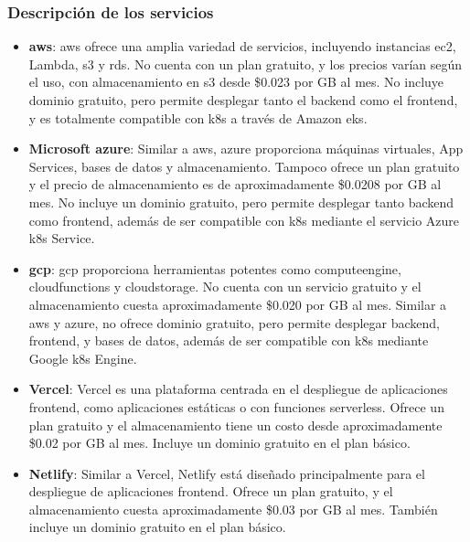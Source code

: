 \subsubsection*{Descripción de los servicios}


\begin{itemize}
    \item \textbf{\gls{aws}\cite{aws-ref}}: \gls{aws} ofrece una amplia variedad de servicios, incluyendo instancias \gls{ec2}, Lambda, \gls{s3} y \gls{rds}. No cuenta con un plan gratuito, y los precios varían según el uso, con almacenamiento en \gls{s3} desde \$0.023 por GB al mes. No incluye dominio gratuito, pero permite desplegar tanto el \gls{backend} como el \gls{frontend}, y es totalmente compatible con \gls{k8s} a través de Amazon \gls{eks}.
    
    \item \textbf{Microsoft \gls{azure}\cite{azure-ref}}: Similar a \gls{aws}, \gls{azure} proporciona máquinas virtuales, App Services, bases de datos y almacenamiento. Tampoco ofrece un plan gratuito y el precio de almacenamiento es de aproximadamente \$0.0208 por GB al mes. No incluye un dominio gratuito, pero permite desplegar tanto \gls{backend} como \gls{frontend}, además de ser compatible con \gls{k8s} mediante el servicio Azure \gls{k8s} Service.
    
    \item \textbf{\gls{gcp}\cite{gcp-ref}}: \gls{gcp} proporciona herramientas potentes como \gls{computeengine}, \gls{cloudfunctions} y \gls{cloudstorage}. No cuenta con un servicio gratuito y el almacenamiento cuesta aproximadamente \$0.020 por GB al mes. Similar a \gls{aws} y \gls{azure}, no ofrece dominio gratuito, pero permite desplegar \gls{backend}, \gls{frontend}, y bases de datos, además de ser compatible con \gls{k8s} mediante Google \gls{k8s} Engine.
    
    \item \textbf{Vercel\cite{vercel-ref}}: Vercel es una plataforma centrada en el despliegue de aplicaciones \gls{frontend}, como aplicaciones estáticas o con funciones \gls{serverless}. Ofrece un plan gratuito y el almacenamiento tiene un costo desde aproximadamente \$0.02 por GB al mes. Incluye un dominio gratuito en el plan básico.
    
    \item \textbf{Netlify\cite{netlify-ref}}: Similar a Vercel, Netlify está diseñado principalmente para el despliegue de aplicaciones \gls{frontend}. Ofrece un plan gratuito, y el almacenamiento cuesta aproximadamente \$0.03 por GB al mes. También incluye un dominio gratuito en el plan básico.
    

\end{itemize}
